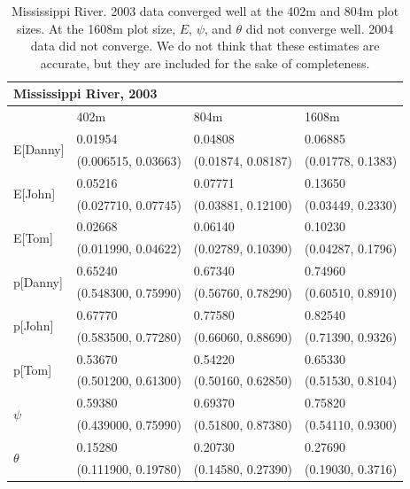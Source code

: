 \documentclass[12pt]{article}
\begin{document}
    \begin{table}
    \caption{Mississippi River. 2003 data converged well at the 402m and 804m
    plot sizes. At the 1608m plot size, \(E\), \(\psi\), and \(\theta\) did not
    converge well. 2004 data did not converge. We do not think that these
    estimates are accurate, but they are included for the sake of completeness.}
    \label{Mississippi}
    \begin{center}
    \begin{tabular}{|l|l|l|l|}
        \hline
        \multicolumn{4}{|l|}{\textbf{Mississippi River, 2003}} \\
        \hline
            & 402m & 804m & 1608m \\
        \hline
        \multirow{2}{*}{E[Danny]}
            & 0.01954 & 0.04808 & 0.06885 \\
            & (0.006515, 0.03663) & (0.01874, 0.08187) & (0.01778, 0.1383) \\
        \hline
        \multirow{2}{*}{E[John]}
            & 0.05216 & 0.07771 & 0.13650 \\
            & (0.027710, 0.07745) & (0.03881, 0.12100) & (0.03449, 0.2330) \\
        \hline
        \multirow{2}{*}{E[Tom]}
            & 0.02668 & 0.06140 & 0.10230 \\
            & (0.011990, 0.04622) & (0.02789, 0.10390) & (0.04287, 0.1796) \\
        \hline
        \multirow{2}{*}{p[Danny]}
            & 0.65240 & 0.67340 & 0.74960 \\
            & (0.548300, 0.75990) & (0.56760, 0.78290) & (0.60510, 0.8910) \\
        \hline
        \multirow{2}{*}{p[John]}
            & 0.67770 & 0.77580 & 0.82540 \\
            & (0.583500, 0.77280) & (0.66060, 0.88690) & (0.71390, 0.9326) \\
        \hline
        \multirow{2}{*}{p[Tom]}
            & 0.53670 & 0.54220 & 0.65330 \\
            & (0.501200, 0.61300) & (0.50160, 0.62850) & (0.51530, 0.8104) \\
        \hline
        \multirow{2}{*}{\(\psi\)}
            & 0.59380 & 0.69370 & 0.75820 \\
            & (0.439000, 0.75990) & (0.51800, 0.87380) & (0.54110, 0.9300) \\
        \hline
        \multirow{2}{*}{\(\theta\)}
            & 0.15280 & 0.20730 & 0.27690 \\
            & (0.111900, 0.19780) & (0.14580, 0.27390) & (0.19030, 0.3716) \\
        \hline
    \end{tabular}
    \end{center}


\end{table}
\end{document}
